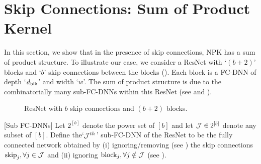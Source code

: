 \section{Skip Connections: Sum of Product Kernel}\label{sec:res}
In this section, we show that in the presence of skip connections, NPK has a sum of product structure. To illustrate our case, we consider a ResNet with `$(b+2)$' blocks and `$b$' skip connections between the blocks (). Each block is a FC-DNN of depth `$d_{\text{blk}}$' and width `$w$'. The sum of product structure is due to the combinatorially many sub-FC-DNNs within this ResNet (see  and ).
\FloatBarrier
\begin{figure}[h]
\caption{\small{ResNet with $b$ skip connections and $(b+2)$ blocks.}}
\label{fig:resnet}
\end{figure}
\begin{definition}\label{def:subfcdnn}[Sub FC-DNNs]
Let $2^{[b]}$ denote the power set of $[b]$ and let $\mathcal{J}\in 2^{[b]}$ denote any subset of $[b]$. Define the`$\mathcal{J}^{th}$' sub-FC-DNN of the ResNet to be the fully connected network obtained by (i) ignoring/removing (see ) the skip connections $\text{skip}_j,\forall j\in \mathcal{J}$  and (ii) ignoring $\text{block}_{j},\forall j\notin \mathcal{J}$ (see ).
\end{definition}
\FloatBarrier
